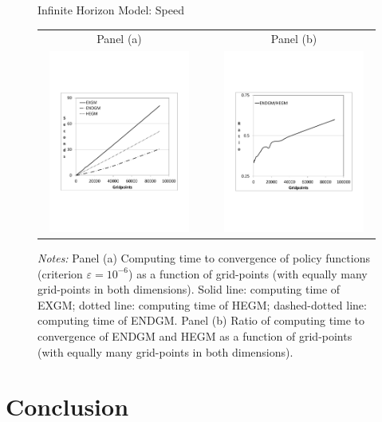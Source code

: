 \documentclass[a4paper,12pt]{article}
\begin{document}
\begin{figure}[htbp]
	\caption{Infinite Horizon Model: Speed}
	\label{graph_infinte}
	\centering
	\begin{tabular}{cC{1cm}c}
	Panel (a) & & Panel (b)  \\
	\includegraphics[height=6.0cm, width=6.0cm]{Abbildungen/seconds_Infinite.pdf} & & \includegraphics[height=6.0cm, width=6.0cm]{Abbildungen/Ratio_Infinite.pdf} \\
	\end{tabular}
	\caption*{\footnotesize{\emph{Notes:} Panel (a) Computing time to convergence of policy functions (criterion $\varepsilon=10^{-6}$) as a function of grid-points (with equally many grid-points in both dimensions). Solid line: computing time of EXGM; dotted line: computing time of HEGM; dashed-dotted line: computing time of ENDGM. Panel (b) Ratio of computing time to convergence of ENDGM and HEGM as a function of grid-points (with equally many grid-points in both dimensions).}}
\end{figure}

\clearpage

\section{Conclusion}
\end{document}
